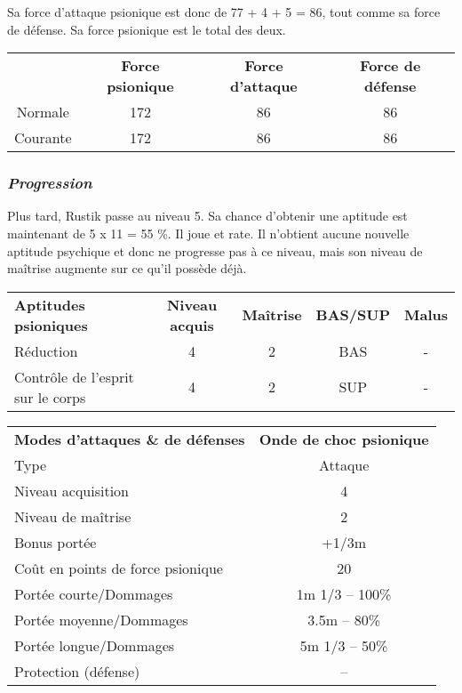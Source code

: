 Sa force d'attaque psionique est donc de 77 + 4 + 5 = 86, tout comme sa force de défense. Sa force psionique est le total des deux.

\bigskip

\begin{tabular}{cccc}
& \textbf{Force psionique} & \textbf{Force d'attaque} & \textbf{Force de défense}  \\
Normale & 172 & 86 & 86 \\
Courante & 172 & 86 & 86 \\
\end{tabular}



\subsubsection*{\textit{Progression}}

Plus tard, Rustik passe au niveau 5. Sa chance d'obtenir une aptitude est maintenant de 5 x 11 = 55 \%. Il joue et rate. Il n'obtient aucune nouvelle aptitude psychique et donc ne progresse pas à ce niveau, mais son niveau de maîtrise augmente sur ce qu'il possède déjà.

\bigskip

\begin{tabular}{lcccc}
\textbf{Aptitudes psioniques} & \textbf{Niveau acquis} & \textbf{Maîtrise}  & \textbf{BAS/SUP} & \textbf{Malus} \\
Réduction                         & 4 & 2 & BAS & - \\
Contrôle de l'esprit sur le corps & 4 & 2 & SUP & - \\
\end{tabular}

\bigskip

\begin{tabular}{lc}
\textbf{Modes d'attaques \& de défenses} & \textbf{Onde de choc psionique} \\
Type                                & Attaque \\
Niveau acquisition                  & 4 \\
Niveau de maîtrise                  & 2 \\
Bonus portée                        & +1/3m \\
Coût en points de force psionique   & 20 \\
Portée courte/Dommages              &   1m 1/3 -- 100\% \\
Portée moyenne/Dommages             & 3.5m -- 80\% \\
Portée longue/Dommages              &   5m 1/3 -- 50\%  \\
Protection (défense)                & -- \\
\end{tabular}

